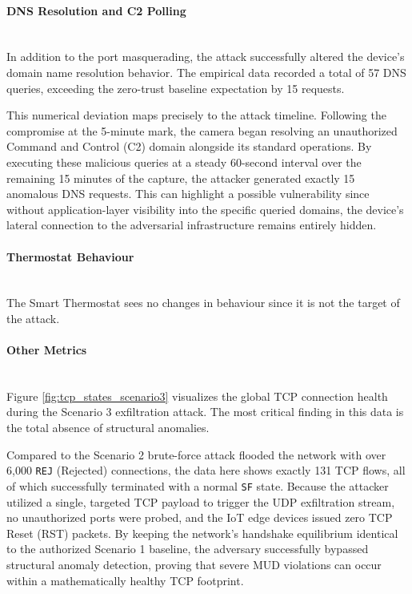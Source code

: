 \paragraph{DNS Resolution and C2 Polling}\mbox{}\\

In addition to the port masquerading, the attack successfully altered the device's domain name resolution behavior. The empirical data recorded a total of 57 DNS queries, exceeding the zero-trust baseline expectation by 15 requests. 

This numerical deviation maps precisely to the attack timeline. Following the compromise at the 5-minute mark, the camera began resolving an unauthorized Command and Control (C2) domain alongside its standard operations. By executing these malicious queries at a steady 60-second interval over the remaining 15 minutes of the capture, the attacker generated exactly 15 anomalous DNS requests. This can highlight a possible vulnerability since without application-layer visibility into the specific queried domains, the device's lateral connection to the adversarial infrastructure remains entirely hidden.

\paragraph{Thermostat Behaviour}\mbox{}\\

The Smart Thermostat sees no changes in behaviour since it is not the target of the attack.

\paragraph{Other Metrics}\mbox{}\\

Figure \ref{fig:tcp_states_scenario3} visualizes the global TCP connection health during the Scenario 3 exfiltration attack. The most critical finding in this data is the total absence of structural anomalies. 

Compared to the Scenario 2 brute-force attack flooded the network with over 6,000 \texttt{REJ} (Rejected) connections, the data here shows exactly 131 TCP flows, all of which successfully terminated with a normal \texttt{SF} state. Because the attacker utilized a single, targeted TCP payload to trigger the UDP exfiltration stream, no unauthorized ports were probed, and the IoT edge devices issued zero TCP Reset (RST) packets. By keeping the network's handshake equilibrium identical to the authorized Scenario 1 baseline, the adversary successfully bypassed structural anomaly detection, proving that severe MUD violations can occur within a mathematically healthy TCP footprint.

